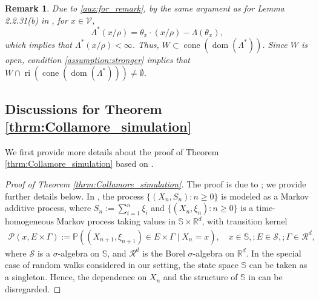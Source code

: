 \documentclass[aap,preprint]{imsart}
\newcommand{\Pro}{{\mathbb{P}}}
\theoremstyle{plain}
\newtheorem{remark}{Remark}[section]
\theoremstyle{definition}
\begin{document}
\begin{appendix}
\begin{remark}
    \label{aux:remark_stronger}
    Due to \eqref{aux:for_remark}, by  the same argument as for Lemma 2.2.31(b) in \cite{dembo2009large}, for $x \in \mathcal{V}$,
$$
\Lambda^{*}(x/\rho) = \theta_x \cdot (x/\rho) - \Lambda(\theta_x),
$$  
which implies that $\Lambda^{*}(x/\rho) < \infty$. Thus, $W \subset \operatorname{cone}(\operatorname{dom}(\Lambda^*))$. Since $W$ is open, condition \eqref{assumption:stronger} implies that $W \cap \operatorname{ri}(\operatorname{cone}(\operatorname{dom}(\Lambda^*))) \neq \emptyset$. 
\end{remark}

\subsection{Discussions for Theorem \ref{thrm:Collamore_simulation}}
\label{app:collomore_simulation}

We first provide more details about the proof of Theorem \ref{thrm:Collamore_simulation} based on \cite{collamore2002}.


\begin{proof}[Proof of Theorem \ref{thrm:Collamore_simulation}]
The proof is due to \cite{collamore2002}; we provide further details below. In \cite{collamore2002}, the process $\{(X_n, S_n) : n \geq 0\}$ is modeled as a Markov additive process, where $S_n := \sum_{i=1}^{n} \xi_i$ and $\{(X_n, \xi_n) : n \geq 0\}$ is a time-homogeneous Markov process taking values in $\mathbb{S} \times \mathbb{R}^d$, with transition kernel
\begin{align*}
\mathcal{P}(x, E \times \Gamma) := \Pro\left((X_{n+1}, \xi_{n+1}) \in E \times \Gamma \mid X_n = x\right), \quad x \in \mathbb{S},; E \in \mathcal{S},; \Gamma \in \mathcal{R}^d,
\end{align*}
where $\mathcal{S}$ is a $\sigma$-algebra on $\mathbb{S}$, and $\mathcal{R}^d$ is the Borel $\sigma$-algebra on $\mathbb{R}^d$. In the special case of random walks considered in our setting, the state space $\mathbb{S}$ can be taken as a singleton. Hence, the dependence on ${X_n}$ and the structure of $\mathbb{S}$ in \cite{collamore2002} can be disregarded.


\end{proof}
\end{appendix}
\end{document}
